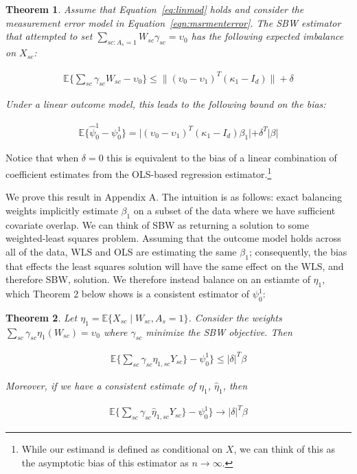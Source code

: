 \documentclass[aoas]{imsart}
\theoremstyle{plain}
\newtheorem{theorem}{Theorem}[section]
\theoremstyle{remark}
\begin{document}
\begin{theorem}
Assume that Equation~\ref{eq:linmod} holds and consider the measurement error model in Equation~\ref{eqn:msrmenterror}. The SBW estimator that attempted to set $\sum_{sc: A_s = 1}W_{sc}\gamma_{sc} = \upsilon_0$  has the following expected imbalance on $X_{sc}$:

\begin{align*}
\mathbb{E}\{\sum_{sc}\gamma_{sc}W_{sc} - \upsilon_0\} \le \|(\upsilon_0 - \upsilon_1)^T(\kappa_1 - I_d)\| + \delta
\end{align*}

Under a linear outcome model, this leads to the following bound on the bias:

\begin{align*}
\mathbb{E}\{\hat{\psi}^{1}_0 - \psi^1_0\} = \lvert(\upsilon_0 - \upsilon_1)^T(\kappa_1 - I_d)\beta_1\lvert + \delta^T\lvert\beta\lvert
\end{align*}
\end{theorem}

Notice that when $\delta = 0$ this is equivalent to the bias of a linear combination of coefficient estimates from the OLS-based regression estimator.\footnote{While our estimand is defined as conditional on $X$, we can think of this as the asymptotic bias of this estimator as $n \to \infty$.} 

We prove this result in Appendix A. The intuition is as follows: exact balancing weights implicitly estimate $\beta_1$ on a subset of the data where we have sufficient covariate overlap. We can think of SBW as returning a solution to some weighted-least squares problem. Assuming that the outcome model holds across all of the data, WLS and OLS are estimating the same $\beta_1$; consequently, the bias that effects the least squares solution will have the same effect on the WLS, and therefore SBW, solution. We therefore instead balance on an estiamte of $\eta_1$, which Theorem 2 below shows is a consistent estimator of $\psi_0^1$:

\begin{theorem}

Let $\eta_1 = \mathbb{E}\{X_{sc} \mid W_{sc}, A_s = 1\}$. Consider the weights $\sum_{sc}\gamma_{sc}\eta_1(W_{sc}) = \upsilon_0$ where $\gamma_{sc}$ minimize the SBW objective. Then

\begin{align*}
    \mathbb{E}\{\sum_{sc}\gamma_{sc}\eta_{1, sc}Y_{sc}\} - \psi_0^1\} \le \lvert \delta \lvert ^T\beta
\end{align*}

Moreover, if we have a consistent estimate of $\eta_1$, $\hat{\eta}_1$, then

\begin{align*}
    \mathbb{E}\{\sum_{sc}\gamma_{sc}\hat{\eta}_{1, sc}Y_{sc}\} - \psi_0^1\} \to \lvert \delta \lvert ^T\beta
\end{align*}

\end{theorem}
\end{document}
